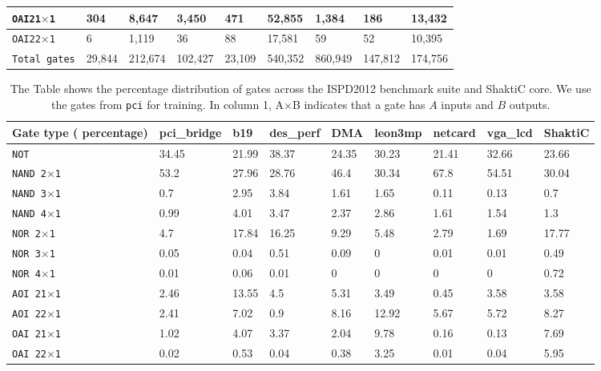 \begin{table}[!ht]
\begin{tabular}{|p{2cm}|p{1cm}|p{1.2cm}|p{1.8cm}|p{1cm}|p{1.6cm}|p{1.4cm}|p{1.4cm}|p{1.4cm}|}
    \texttt{OAI21$\times$1}      & 304                  & 8,647         & 3,450               & 471          & 52,855            & 1,384             & 186    & 13,432           \\ \hline
    \texttt{OAI22$\times$1}      & 6                    & 1,119         & 36                 & 88           & 17,581            & 59               & 52       & 10,395         \\ \hline
\texttt{Total gates} & 29,844 &	212,674	& 102,427	& 23,109	& 540,352	& 860,949 &	147,812 & 174,756 \\ \hline
\end{tabular}
\end{table}


\begin{table}[!ht]
\centering
\caption{The Table shows the percentage distribution of gates across the ISPD2012 benchmark suite and ShaktiC core. We use the gates from \texttt{pci} for training. In column 1, A$\times$B indicates that a gate has $A$ inputs and $B$ outputs.}
\label{tab:tab23}
\begin{tabular}{|l|l|l|l|l|l|l|l|l|}
\hline
Gate type ( percentage) & pci\_bridge & b19   & des\_perf & DMA   & leon3mp & netcard & vga\_lcd  & ShaktiC\\ \hline
    \texttt{NOT     }    & 34.45       & 21.99 & 38.37     & 24.35 & 30.23   & 21.41   & 32.66   & 23.66 \\ \hline
    \texttt{NAND 2$\times$1     }            & 53.2        & 27.96 & 28.76     & 46.4  & 30.34   & 67.8    & 54.51 & 30.04    \\ \hline
    \texttt{NAND 3$\times$1     }   & 0.7         & 2.95  & 3.84      & 1.61  & 1.65    & 0.11    & 0.13  & 0.7   \\ \hline
    \texttt{NAND 4$\times$1     }   & 0.99        & 4.01  & 3.47      & 2.37  & 2.86    & 1.61    & 1.54  & 1.3   \\ \hline
    \texttt{NOR 2$\times$1    }   & 4.7         & 17.84 & 16.25     & 9.29  & 5.48    & 2.79    & 1.69   & 17.77  \\ \hline
    \texttt{NOR  3$\times$1   }   & 0.05        & 0.04  & 0.51      & 0.09  & 0       & 0.01    & 0.01  & 0.49   \\ \hline
    \texttt{NOR  4$\times$1   }   & 0.01        & 0.06  & 0.01      & 0     & 0       & 0       & 0    &  0.72   \\ \hline
    \texttt{AOI  21$\times$1   }   & 2.46        & 13.55 & 4.5       & 5.31  & 3.49    & 0.45    & 3.58  & 3.58   \\ \hline
    \texttt{AOI   22$\times$1  }   & 2.41        & 7.02  & 0.9       & 8.16  & 12.92   & 5.67    & 5.72   & 8.27  \\ \hline
    \texttt{OAI 21$\times$1    }   & 1.02        & 4.07  & 3.37      & 2.04  & 9.78    & 0.16    & 0.13  & 7.69 \\ \hline
    \texttt{OAI  22$\times$1   }   & 0.02        & 0.53  & 0.04      & 0.38  & 3.25    & 0.01    & 0.04  & 5.95   \\ \hline
\end{tabular}
\end{table}

